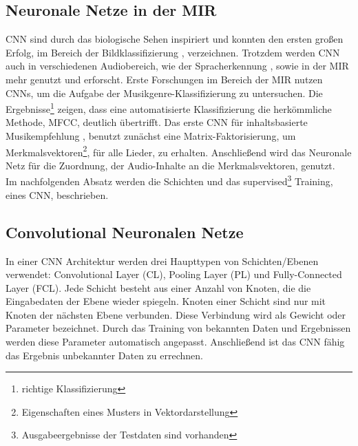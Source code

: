 \documentclass[twosided,a4,10pt]{article}
\begin{document}
\begin{multicols}{2}
		\section{Neuronale Netze in der MIR}
		CNN sind durch das biologische Sehen inspiriert und konnten den ersten großen Erfolg, im Bereich der Bildklassifizierung \cite{alex}, verzeichnen. Trotzdem werden CNN auch in verschiedenen Audiobereich, wie der Spracherkennung \cite{graves}, sowie in der MIR mehr genutzt und erforscht.\newline
		Erste Forschungen im Bereich der MIR nutzen CNNs, um die Aufgabe der Musikgenre-Klassifizierung \cite{lee} zu untersuchen. Die Ergebnisse\footnote[9]{richtige Klassifizierung} zeigen, dass eine automatisierte Klassifizierung die herkömmliche Methode, MFCC, deutlich übertrifft. Das erste CNN für inhaltsbasierte Musikempfehlung \cite{oord}, benutzt zunächst eine Matrix-Faktorisierung, um Merkmalsvektoren\footnote[10]{Eigenschaften eines Musters in Vektordarstellung}, für alle Lieder, zu erhalten. Anschließend wird das Neuronale Netz für die Zuordnung, der Audio-Inhalte an die Merkmalsvektoren, genutzt. \cite{wang}\newline\\
		Im nachfolgenden Absatz werden die Schichten und das supervised\footnote[11]{Ausgabeergebnisse der Testdaten sind vorhanden} Training, eines CNN, beschrieben.
		\subsection{Convolutional Neuronalen Netze}
		In einer CNN Architektur werden drei Haupttypen von Schichten/Ebenen verwendet: Convolutional Layer (CL), Pooling Layer (PL) und Fully-Connected Layer (FCL). Jede Schicht besteht aus einer Anzahl von Knoten, die die Eingabedaten der Ebene wieder spiegeln. Knoten einer Schicht sind nur mit Knoten der nächsten Ebene verbunden. Diese Verbindung wird als Gewicht oder Parameter bezeichnet. Durch das Training von bekannten Daten und Ergebnissen werden diese Parameter automatisch angepasst. Anschließend ist das CNN fähig das Ergebnis unbekannter Daten zu errechnen.

\end{multicols}
\end{document}
